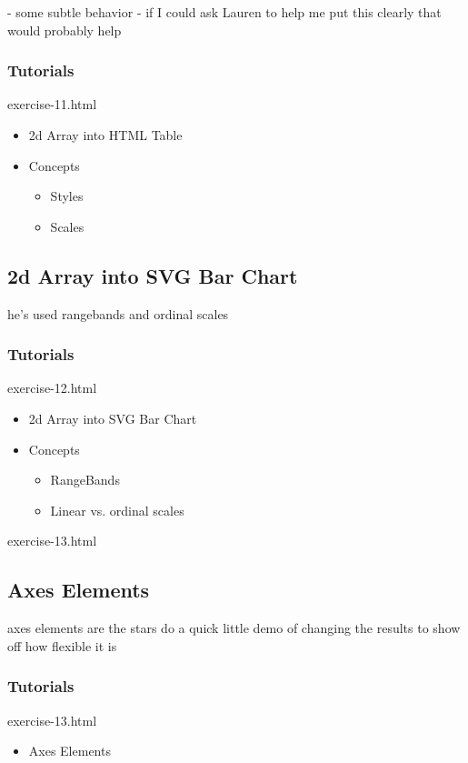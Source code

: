 \documentclass{beamer}
\begin{document}
- some subtle behavior
- if I could ask Lauren to help me put this clearly that would probably help

\begin{frame}
    \frametitle{Tutorials}
    \begin{block}{exercise-11.html}
        \pause
        \begin{itemize}
        \pause
        \item 2d Array into HTML Table
        \pause
        \item Concepts
            \begin{itemize}
                \item Styles
                \item Scales
            \end{itemize}
        \end{itemize}
    \end{block}
\end{frame}


\subsection{2d Array into SVG Bar Chart}

he's used rangebands and ordinal scales


\begin{frame}
    \frametitle{Tutorials}
    \begin{block}{exercise-12.html}
        \pause
        \begin{itemize}
        \pause
        \item 2d Array into SVG Bar Chart
        \pause
        \item Concepts
            \begin{itemize}
                \item RangeBands
                \item Linear vs. ordinal scales
            \end{itemize}
        \end{itemize}
    \end{block}
\end{frame}


exercise-13.html
\subsection{Axes Elements}
axes elements are the stars
do a quick little demo of changing the results to show off how flexible it is
\begin{frame}
    \frametitle{Tutorials}
    \begin{block}{exercise-13.html}
        \begin{itemize}
            \pause
            \item Axes Elements
        \end{itemize} 
    \end{block}
\end{frame}
\end{document}

